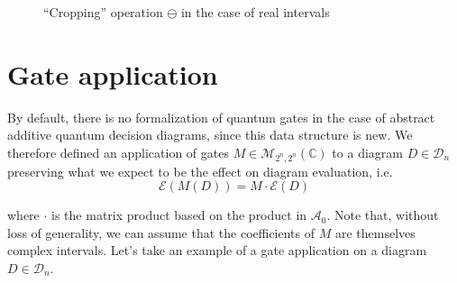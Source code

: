 \begin{figure}[ht]
  \centering
  \caption{“Cropping” operation $\ominus$ in the case of real intervals}
  \label{fig:rognage}
\end{figure}

\section{Gate application}
\label{sec:Portes}

By default, there is no formalization of quantum gates in the case of abstract additive quantum decision diagrams, since this data structure is new. We therefore defined an application of gates $M \in \mathcal M_{2^n, 2^n}(\mathbb C)$ to a diagram $D \in \mathcal D_n$ preserving what we expect to be the effect on diagram evaluation, i.e.
$$\mathcal E(M(D)) = M \cdot \mathcal E(D)$$

\noindent where $\cdot$ is the matrix product based on the product in $\mathcal A_0$.
Note that, without loss of generality, we can assume that the coefficients of $M$ are themselves complex intervals. Let's take an example of a gate application on a diagram $D \in \mathcal D_n$.

